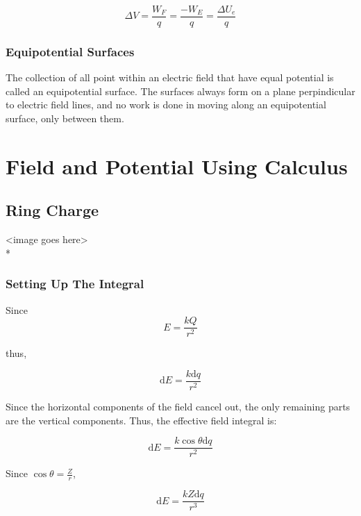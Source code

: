\documentclass[a4paper,12pt]{article}
\begin{document}
								\begin{equation*}
										\Delta V = \frac{W_{F}}{q} = \frac{-W_{E}}{q} = \frac{\Delta U_{e}}{q}
								\end{equation*}
						\subsubsection{Equipotential Surfaces}
								The collection of all point within an electric field that have equal potential is called an equipotential surface. The surfaces always form on a plane perpindicular to electric field lines, and no work is done in moving along an equipotential surface, only between them.

		\section{Field and Potential Using Calculus}
				\subsection{Ring Charge}
						<image goes here>\\*
						\subsubsection{Setting Up The Integral}
								Since 
								\begin{equation*}
										E = \frac{kQ}{r^{2}}
								\end{equation*}

								thus,

								\begin{equation*}
										\mathrm{d}E = \frac{k\mathrm{d}q}{r^{2}}
								\end{equation*}

								Since the horizontal components of the field cancel out, the only remaining parts are the vertical components. Thus, the effective field integral is:

								\begin{equation*}
										\mathrm{d}E = \frac{k\cos{\theta}\mathrm{d}q}{r^{2}}
								\end{equation*}

								Since $\cos{\theta} = \frac{Z}{r}$, 

								\begin{equation*}
										\mathrm{d}E = \frac{kZ\mathrm{d}q}{r^{3}}
								\end{equation*}
\end{document}
